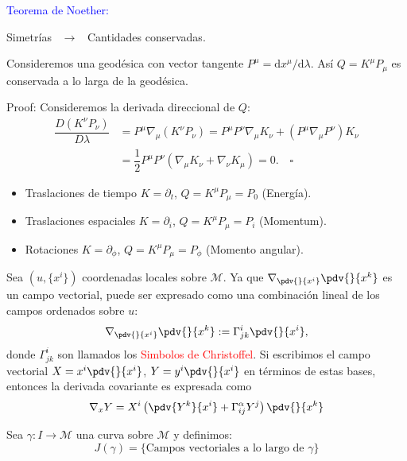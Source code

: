 \documentclass[../main]{subfiles}
\begin{document}
\begin{adjustwidth}{0pt}{-100pt}
\textcolor{blue}{Teorema de Noether:} 
\begin{center}
    Simetrías \ $\rightarrow$ \ Cantidades conservadas.
\end{center}

\proposicion{} Consideremos una geodésica con vector tangente $P^{\mu}=\mathrm{d}x^{\mu}/\mathrm{d}\lambda$. Así $Q=K^{\mu}P_{\mu}$ es conservada a lo larga de la geodésica.

Proof: Consideremos la derivada direccional de $Q$:
\begin{equation}
    \begin{aligned}
        \dfrac{D(K^{\nu}P_{\nu})}{D\lambda}&= P^{\mu}\nabla_{\mu}(K^{\nu}P_{\nu})=P^{\mu}P^{\nu}\nabla_{\mu}K_{\nu}+(P^{\mu}\nabla_{\mu}P^{\nu})K_{\nu}\\
        &=\dfrac{1}{2}P^{\mu}P^{\nu}(\nabla_{\mu}K_{\nu}+\nabla_{\nu}K_{\mu})=0. \quad \square
    \end{aligned}
\end{equation}

\ejemplo{}
\begin{itemize}
    \item Traslaciones de tiempo $K=\partial_t$, $Q=K^{\mu}P_{\mu}=P_0$ (Energía).
    \item Traslaciones espaciales $K=\partial_i$, $Q=K^{\mu}P_{\mu}=P_i$ (Momentum).
    \item Rotaciones $K=\partial_{\phi}$, $Q=K^{\mu}P_{\mu}=P_{\phi}$ (Momento angular).
\end{itemize}

Sea $(u, \{x^{i}\})$ coordenadas locales sobre $\mathcal{M}$. Ya que $\nabla_{\pdv{}{x^{i}}} \pdv{}{x^{k}}$ es un campo vectorial, puede ser expresado como una combinación lineal de los campos ordenados sobre $u$:
\begin{equation}
    \nabla_{\pdv{}{x^{i}}} \pdv{}{x^k}:= \Gamma^{i}_{jk} \pdv{}{x^{i}},
\end{equation}
donde $\Gamma^{i}_{jk}$ son llamados los \textcolor{red}{Simbolos de Christoffel}. Si escribimos el campo vectorial $X=x^{i}\pdv{}{x^{i}}$, $Y=y^{i}\pdv{}{x^{i}}$ en términos de estas bases, entonces la derivada covariante es expresada como 
\begin{equation}
    \nabla_x Y=X^{i}\left(\pdv{Y^k}{x^{i}}+\Gamma^{\alpha}_{ij} Y^j\right)\pdv{}{x^k}
\end{equation}

Sea $\gamma: I \rightarrow \mathcal{M}$ una curva sobre $\mathcal{M}$ y definimos:
\begin{equation}
    J(\gamma)=\{ \text{Campos vectoriales a lo largo de } \gamma \}
\end{equation}


\end{adjustwidth}
\end{document}
